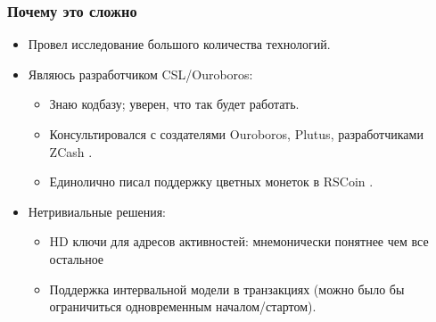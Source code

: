 \documentclass[11pt,handout,pdf,hyperref={unicode}]{beamer}
\newcommand{\backupend}{
   \setcounter{framenumber}{\value{finalframe}}
}
\begin{document}
\begin{frame}
  \frametitle{Почему это сложно}

  \begin{itemize}
  \item Провел исследование большого количества технологий.
  \item Являюсь разработчиком CSL/Ouroboros:
    \begin{itemize}
    \item Знаю кодбазу; уверен, что так будет работать.
    \item Консультировался с создателями Ouroboros,
      Plutus\parencite{plutus}, разработчиками ZCash
      \parencite{zerocash}.
    \item Единолично писал поддержку цветных монеток в RSCoin
      \parencite{rscoin}.
    \end{itemize}
  \item Нетривиальные решения:
    \begin{itemize}
    \item HD ключи для адресов активностей: мнемонически понятнее чем
      все остальное
    \item Поддержка интервальной модели в транзакциях (можно было бы
      ограничиться одновременным началом/стартом).
    \end{itemize}
  \end{itemize}
\end{frame}

\backupend
\end{document}
